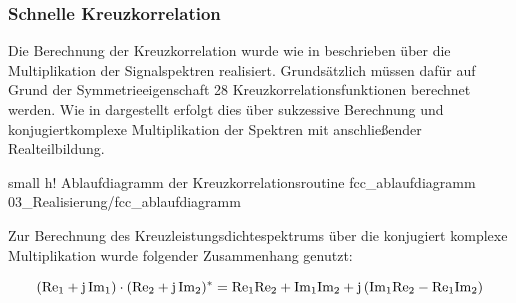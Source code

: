 \subsubsection{Schnelle Kreuzkorrelation}
Die Berechnung der Kreuzkorrelation wurde wie in  beschrieben über die Multiplikation der Signalspektren realisiert. Grundsätzlich müssen dafür auf Grund der Symmetrieeigenschaft 28 Kreuzkorrelationsfunktionen berechnet werden. Wie in  dargestellt erfolgt dies über sukzessive Berechnung und konjugiertkomplexe Multiplikation der Spektren mit anschließender Realteilbildung.



         {small}                                              %
         {h!}                                                  %
         {Ablaufdiagramm der Kreuzkorrelationsroutine}       %
         {fcc_ablaufdiagramm}                                 %
         {03_Realisierung/fcc_ablaufdiagramm}                 %




Zur Berechnung des Kreuzleistungsdichtespektrums über die konjugiert komplexe Multiplikation wurde folgender Zusammenhang genutzt:

\begin{equation}\label{eq:kplxKonjMul}
    (\mathrm{Re}_{1} + \im \, \mathrm{Im}_{1}) \cdot (\mathrm{Re}_{2} + \im \, \mathrm{Im}_{2})^* = \mathrm{Re}_{1}\mathrm{Re}_{2} + \mathrm{Im}_{1}\mathrm{Im}_{2} + \im \, (\mathrm{Im}_{1}\mathrm{Re}_{2} - \mathrm{Re}_{1}\mathrm{Im}_{2})
\end{equation}

